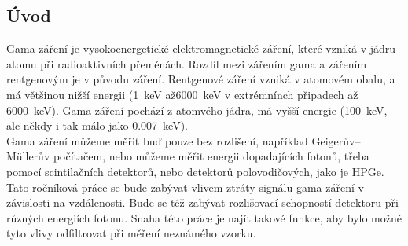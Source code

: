 \documentclass[12pt,a4paper]{article}
\begin{document}
\begin{spacing}{1.5}
\section*{Úvod}%
Gama záření je vysokoenergetické elektromagnetické záření, které vzniká v jádru atomu při radioaktivních přeměnách. Rozdíl mezi zářením gama a zářením rentgenovým je v původu záření. Rentgenové záření vzniká v atomovém obalu, a má většinou nižší energii (\SI{1}{\kilo\electronvolt} až\SI{6000}{\kilo\electronvolt} v extrémnínch připadech až \SI{6000}{\kilo\electronvolt}). Gama záření pochází z atomvého jádra, má vyšší energie (\SI{100}{\kilo\electronvolt}, ale někdy i tak málo jako \SI{0.007}{\kilo\electronvolt}).\\%
Gama záření můžeme měřit buď pouze bez rozlišení, například Geigerův–Müllerův počítačem, nebo můžeme měřit energii dopadajících fotonů, třeba pomocí scintilačních detektorů, nebo detektorů polovodičových, jako je HPGe.\\
Tato ročníková práce se bude zabývat vlivem ztráty signálu gama záření v závislosti na vzdálenosti. Bude se též zabývat rozlišovací schopností detektoru při různých energiích fotonu. Snaha této práce je najít takové funkce, aby bylo možné tyto vlivy odfiltrovat při měření neznámého vzorku.\\
\newpage

\end{spacing}
\end{document}

